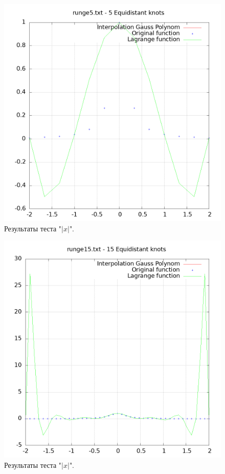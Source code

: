 \documentclass[14pt,a4paper]{extarticle}
\newcommand{\1}{\mathbbm{1}}
\begin{document}
    \begin{figure}
        \centering
        \includegraphics[scale=0.5]{Images/runge5.txt.png}
        \caption{Результаты теста "$|x|$".}
    \end{figure}
    \begin{figure}
        \centering
        \includegraphics[scale=0.5]{Images/runge15.txt.png}
        \caption{Результаты теста "$|x|$".}
    \end{figure}
\end{document}
